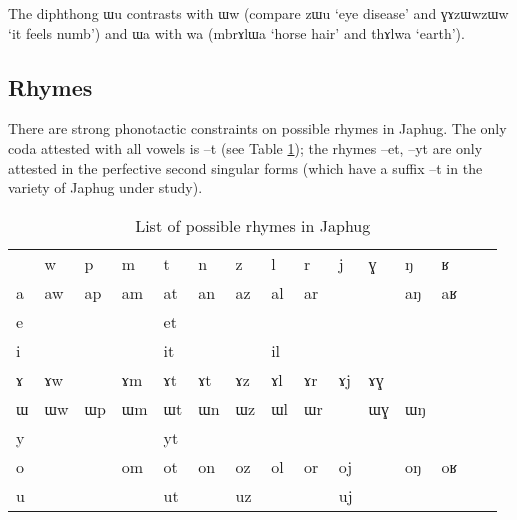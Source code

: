\documentclass[oldfontcommands,oneside,a4paper,11pt]{article}
\newcommand{\ipa}[1]{{\phon #1}} %
\begin{document}
          The diphthong \ipa{ɯu} contrasts with \ipa{ɯw} (compare \ipa{zɯu}  `eye disease' and \ipa{ɣɤzɯwzɯw} `it feels numb') and \ipa{ɯa} with \ipa{wa} (\ipa{mbrɤlɯa} `horse hair' and \ipa{thɤlwa} `earth').
          
          
          
     
\subsection{Rhymes}     \label{sec:rhymes}
     There are strong phonotactic constraints on possible rhymes in Japhug. The only coda attested with all  vowels is \ipa{--t} (see Table \ref{tab:rhymes}); the rhymes \ipa{--et}, \ipa{--yt} are only attested in the perfective second singular forms (which have a suffix \ipa{--t} in the variety of Japhug under study).
    
   \begin{table}
 \caption{List of possible rhymes in Japhug} \label{tab:rhymes}  \centering
\begin{tabular}{lllllllllllllll}
\toprule 
 &	\ipa{w} &	\ipa{p} &	\ipa{m} &	\ipa{t} &	\ipa{n} &	\ipa{z} &	\ipa{l} &	\ipa{r} &	\ipa{j } &	\ipa{ɣ} &	\ipa{ŋ} &	\ipa{ʁ} \\
\ipa{a} &	\ipa{aw} &	\ipa{ap} &	\ipa{am} &	\ipa{at} &	\ipa{an} &	\ipa{az} &	\ipa{al} &	\ipa{ar} &	 &	 &	\ipa{aŋ} &	\ipa{aʁ} \\
\ipa{e} &	 &	 &	 &	\ipa{et} &	 &	 &	 &	 &	 &	 &	 &	 \\
\ipa{i} &	 &	 &	 &	\ipa{it} &	 &	 &	\ipa{il} &	 &	 &	 &	 &	 \\
\ipa{ɤ} &	\ipa{ɤw} &	 &	\ipa{ɤm} &	\ipa{ɤt} &	\ipa{ɤt} &	\ipa{ɤz} &	\ipa{ɤl} &	\ipa{ɤr} &	\ipa{ɤj} &	\ipa{ɤɣ} &	 &	 \\
\ipa{ɯ} &	\ipa{ɯw} &	\ipa{ɯp} &	\ipa{ɯm} &	\ipa{ɯt} &	\ipa{ɯn} &	\ipa{ɯz} &	\ipa{ɯl} &	\ipa{ɯr} &	 &	\ipa{ɯɣ} &	\ipa{ɯŋ} &	 \\
\ipa{y} &	 &	 &	 &	\ipa{yt} &	 &	 &	 &	 &	 &	 &	 &	 \\
\ipa{o} &	 &	 &	\ipa{om} &	\ipa{ot} &	\ipa{on} &	\ipa{oz} &	\ipa{ol} &	\ipa{or} &	\ipa{oj} &	 &	\ipa{oŋ} &	\ipa{oʁ} \\
\ipa{u} &	 &	 &	 &	\ipa{ut} &	 &	\ipa{uz} &	 &	 &	\ipa{uj} &	 &	 &	 \\
\bottomrule
\end{tabular}
\end{table}
\end{document}
